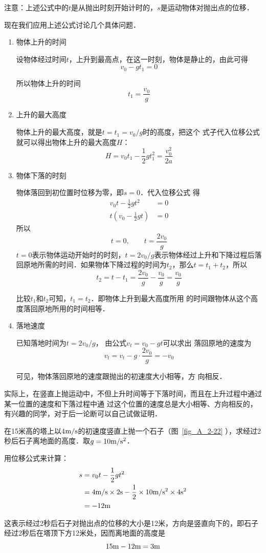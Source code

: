 注意：上述公式中的$t$是从抛出时刻开始计时的，$s$是运动物体对抛出点的位移．

现在我们应用上述公式讨论几个具体问题．
\begin{enumerate}[(1)]
	\item  物体上升的时间
	
	设物体经过时间$t$，上升到最高点，在这一时刻，物体是静止的，由此可得
	\[v_0-gt_1=0 \]
	
	所以物体上升的时间
	\[t_1=\frac{v_0}{g} \]
	
	\item 上升的最大高度
	
	物体上升的最大高度，就是$t=t_1=v_0/g$时的高度，把这个
	式子代入位移公式就可以得出物体上升的最大高度$H$：
	\[H=v_0t_1-\frac{1}{2}gt_1^2=\frac{v^2_0}{2a} \]
	
	\item 物体下落的时刻
	
	物体落回到初位置时位移为零，即$s=0$．代入位移公式
	得
	\[\begin{split}
	v_0 t-\frac{1}{2}gt^2&=0\\
	t\left(v_0-\frac{1}{2}gt\right)&=0
	\end{split} \]
	所以
	\[t=0,\qquad t=\frac{2v_0}{g} \]
	$t=0$表示物体运动开始时的时刻，$t=2v_0/g$表示物体经过上升和下降过程后落回原地所需的时间．如果物体下降过程的时间为$t_2$，那么$t=t_1+t_2$，所以
	\[t_2=t-t_1=\frac{2v_0}{g}-\frac{v_0}{g}=\frac{v_0}{g} \]
	
	比较$t_1$和$t_2$可知，$t_1=t_2$．即物体上升到最大高度所用
	的时间跟物体从这个高度落回原地所用的时间相等．
	
	\item 落地速度
	
	已知落地时间为$t=2v_0/g$，
	由公式$v_t=v_0-gt$可以求出
	落回原地的速度为
	\[v_t=v_t-g\cdot \frac{2v_0}{g}=-v_0 \]
	
	可见，物体落回原地的速度跟抛出的初速度大小相等，方
	向相反．
\end{enumerate}

实际上，在竖直上抛运动中，不但上升时间等于下落时间，而且在上升过程中通过某一位置的速度和下落过程中通
过这个位置的速度总是大小相等、方向相反的，有兴趣的同学，对于后一论断可以自己试做证明．

\begin{example}
在15米高的塔上以4$\text{m}/\text{s}$的初速度竖直上抛一个石子（图~\ref{fig_A_2-22} ），求经过2秒后石子离地面的高度．取$g=10\text{m}/\text{s}^2$．
\end{example}

\begin{solution}
用位移公式来计算：
\[\begin{split}
s&=v_0 t-\frac{1}{2}gt^2\\
&=4\text{m}/\text{s} \times 2{\rm s}-\frac{1}{2}\times 10\text{m}/\text{s}^2 \times 4{\rm s^2}\\
&=-12{\rm m}
\end{split} \]

这表示经过2秒后石子对抛出点的位移的大小是12米，方向是竖直向下的，即石子经过2秒后在塔顶下方12米处，因而离地面的高度是
\[15{\rm m}-12{\rm m}=3{\rm m}\]
\end{solution}


